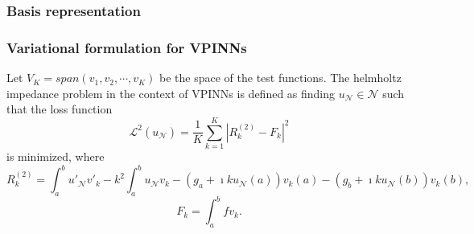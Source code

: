 \subsubsection{Basis representation}\label{sec:vpinnsbasis}

\subsubsection{Variational formulation for VPINNs}\label{sec:vpinnsformulation}
Let $V_K = span(v_1, v_2, \cdots, v_K)$ be the space of the test functions. The helmholtz impedance problem in the context of VPINNs is defined as finding $u_{\mathcal{N}} \in \mathcal{N}$ such that the loss function
\begin{equation}
    \label{eq:lossfunction}
    \mathcal{L}^2(u_{\mathcal{N}}) = \frac{1}{K} \sum_{k=1}^{K}{|R_k^{(2)} - F_k|^2}
\end{equation}
is minimized, where
\begin{equation}
    \label{eq:vpinnrhs}
    R_k^{(2)} = \int_{a}^{b}{u'_{\mathcal{N}}v'_k} - k^2 \int_{a}^{b}{u_{\mathcal{N}}v_k} - (g_a + \imath ku_{\mathcal{N}}(a))v_k(a) - (g_b + \imath ku_{\mathcal{N}}(b))v_k(b),
\end{equation}
\begin{equation}
    \label{eq:vpinnlhs}
    F_k = \int_{a}^{b}{fv_k}.
\end{equation}

